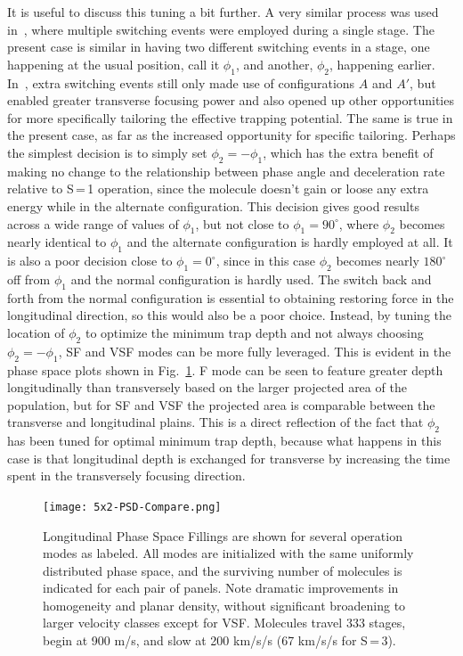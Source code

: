 It is useful to discuss this tuning a bit further. 
A very similar process was used in~\cite{Zhang2016}, where multiple switching events were employed during a single stage.
The present case is similar in having two different switching events in a stage, one happening at the usual position, call it $\phi_1$, and another, $\phi_2$, happening earlier.
In~\cite{Zhang2016}, extra switching events still only made use of configurations $A$ and $A'$, but enabled greater transverse focusing power and also opened up other opportunities for more specifically tailoring the effective trapping potential.
The same is true in the present case, as far as the increased opportunity for specific tailoring. 
Perhaps the simplest decision is to simply set $\phi_2=-\phi_1$, which has the extra benefit of making no change to the relationship between phase angle and deceleration rate relative to S\,=\,1 operation,  since the molecule doesn't gain or loose any extra energy while in the alternate configuration.
This decision gives good results across a wide range of values of $\phi_1$, but not close to $\phi_1=90^\circ$, where $\phi_2$ becomes nearly identical to $\phi_1$ and the alternate configuration is hardly employed at all.
It is also a poor decision close to $\phi_1=0^\circ$, since in this case $\phi_2$ becomes nearly $180^\circ$ off from $\phi_1$ and the normal configuration is hardly used.
The switch back and forth from the normal configuration is essential to obtaining restoring force in the longitudinal direction, so this would also be a poor choice.
Instead, by tuning the location of $\phi_2$ to optimize the minimum trap depth and not always choosing $\phi_2=-\phi_1$, SF and VSF modes can be more fully leveraged.
This is evident in the phase space plots shown in Fig.~\ref{full5x2phasespace}. 
F mode can be seen to feature greater depth longitudinally than transversely based on the larger projected area of the population, but for SF and VSF the projected area is comparable between the transverse and longitudinal plains.
This is a direct reflection of the fact that $\phi_2$ has been tuned for optimal minimum trap depth, because what happens in this case is that longitudinal depth is exchanged for transverse by increasing the time spent in the transversely focusing direction.

\begin{figure}[t!]
\texttt{[image: 5x2-PSD-Compare.png]}
\caption[Longitudinal Phase Space for different Modes]{\label{full5x2phasespace}
Longitudinal Phase Space Fillings are shown for several operation modes as labeled. 
All modes are initialized with the same uniformly distributed phase space, and the surviving number of molecules is indicated for each pair of panels.
Note dramatic improvements in homogeneity and planar density, without significant broadening to larger velocity classes except for VSF. 
Molecules travel $333$ stages, begin at 900 m/s, and slow at 200 km/s/s (67 km/s/s for S\,=\,3).
}
\end{figure}

